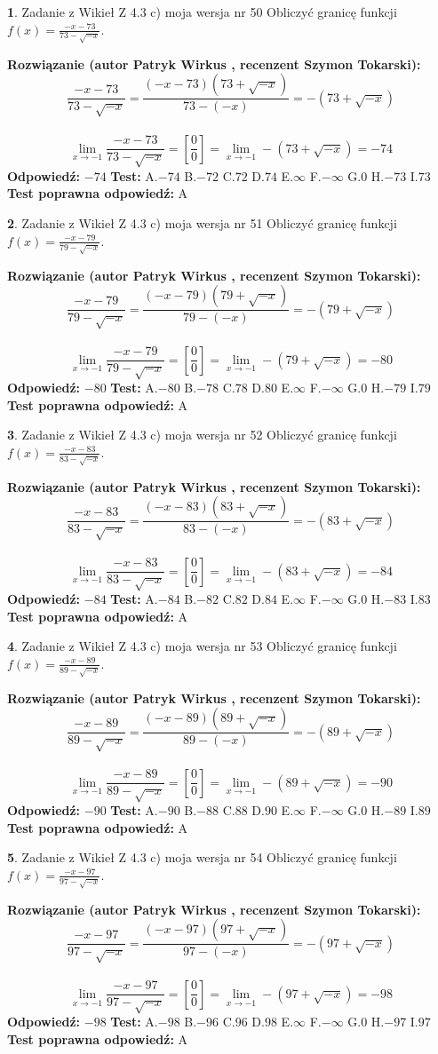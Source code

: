 \documentclass[12pt, a4paper]{article}
\theoremstyle{definition} %
\newtheorem{zad}{}
\newcommand{\zadStart}[1]{\begin{zad}#1\newline}
\newcommand{\zadStop}{\end{zad}}
\newcommand{\rozwStart}[2]{\noindent \textbf{Rozwiązanie (autor #1 , recenzent #2): }\newline}
\newcommand{\rozwStop}{\newline}
\newcommand{\odpStart}{\noindent \textbf{Odpowiedź:}\newline}
\newcommand{\odpStop}{\newline}
\newcommand{\testStart}{\noindent \textbf{Test:}\newline}
\newcommand{\testStop}{\newline}
\newcommand{\kluczStart}{\noindent \textbf{Test poprawna odpowiedź:}\newline}
\newcommand{\kluczStop}{\newline}
\begin{document}
\zadStart{Zadanie z Wikieł Z 4.3 c) moja wersja nr 50}
Obliczyć granicę funkcji $f(x)=\frac{-x-73}{73-\sqrt{-x}}$.
\zadStop
\rozwStart{Patryk Wirkus}{Szymon Tokarski}
$$\frac{-x-73}{73-\sqrt{-x}}=\frac{(-x-73)(73+\sqrt{-x})}{73-(-x)}=-(73+\sqrt{-x})$$
\\
$$\lim\limits_{x\to-1}\frac{-x-73}{73-\sqrt{-x}}=[\frac{0}{0}]=\lim\limits_{x\to-1}-(73+\sqrt{-x}) =-74$$
\rozwStop
\odpStart
$-74$
\odpStop
\testStart
A.$-74$
B.$-72$
C.$72$
D.$74$
E.$\infty$
F.$-\infty$
G.$0$
H.$-73$
I.$73$
\testStop
\kluczStart
A
\kluczStop



\zadStart{Zadanie z Wikieł Z 4.3 c) moja wersja nr 51}
Obliczyć granicę funkcji $f(x)=\frac{-x-79}{79-\sqrt{-x}}$.
\zadStop
\rozwStart{Patryk Wirkus}{Szymon Tokarski}
$$\frac{-x-79}{79-\sqrt{-x}}=\frac{(-x-79)(79+\sqrt{-x})}{79-(-x)}=-(79+\sqrt{-x})$$
\\
$$\lim\limits_{x\to-1}\frac{-x-79}{79-\sqrt{-x}}=[\frac{0}{0}]=\lim\limits_{x\to-1}-(79+\sqrt{-x}) =-80$$
\rozwStop
\odpStart
$-80$
\odpStop
\testStart
A.$-80$
B.$-78$
C.$78$
D.$80$
E.$\infty$
F.$-\infty$
G.$0$
H.$-79$
I.$79$
\testStop
\kluczStart
A
\kluczStop



\zadStart{Zadanie z Wikieł Z 4.3 c) moja wersja nr 52}
Obliczyć granicę funkcji $f(x)=\frac{-x-83}{83-\sqrt{-x}}$.
\zadStop
\rozwStart{Patryk Wirkus}{Szymon Tokarski}
$$\frac{-x-83}{83-\sqrt{-x}}=\frac{(-x-83)(83+\sqrt{-x})}{83-(-x)}=-(83+\sqrt{-x})$$
\\
$$\lim\limits_{x\to-1}\frac{-x-83}{83-\sqrt{-x}}=[\frac{0}{0}]=\lim\limits_{x\to-1}-(83+\sqrt{-x}) =-84$$
\rozwStop
\odpStart
$-84$
\odpStop
\testStart
A.$-84$
B.$-82$
C.$82$
D.$84$
E.$\infty$
F.$-\infty$
G.$0$
H.$-83$
I.$83$
\testStop
\kluczStart
A
\kluczStop



\zadStart{Zadanie z Wikieł Z 4.3 c) moja wersja nr 53}
Obliczyć granicę funkcji $f(x)=\frac{-x-89}{89-\sqrt{-x}}$.
\zadStop
\rozwStart{Patryk Wirkus}{Szymon Tokarski}
$$\frac{-x-89}{89-\sqrt{-x}}=\frac{(-x-89)(89+\sqrt{-x})}{89-(-x)}=-(89+\sqrt{-x})$$
\\
$$\lim\limits_{x\to-1}\frac{-x-89}{89-\sqrt{-x}}=[\frac{0}{0}]=\lim\limits_{x\to-1}-(89+\sqrt{-x}) =-90$$
\rozwStop
\odpStart
$-90$
\odpStop
\testStart
A.$-90$
B.$-88$
C.$88$
D.$90$
E.$\infty$
F.$-\infty$
G.$0$
H.$-89$
I.$89$
\testStop
\kluczStart
A
\kluczStop



\zadStart{Zadanie z Wikieł Z 4.3 c) moja wersja nr 54}
Obliczyć granicę funkcji $f(x)=\frac{-x-97}{97-\sqrt{-x}}$.
\zadStop
\rozwStart{Patryk Wirkus}{Szymon Tokarski}
$$\frac{-x-97}{97-\sqrt{-x}}=\frac{(-x-97)(97+\sqrt{-x})}{97-(-x)}=-(97+\sqrt{-x})$$
\\
$$\lim\limits_{x\to-1}\frac{-x-97}{97-\sqrt{-x}}=[\frac{0}{0}]=\lim\limits_{x\to-1}-(97+\sqrt{-x}) =-98$$
\rozwStop
\odpStart
$-98$
\odpStop
\testStart
A.$-98$
B.$-96$
C.$96$
D.$98$
E.$\infty$
F.$-\infty$
G.$0$
H.$-97$
I.$97$
\testStop
\kluczStart
A
\kluczStop
\end{document}

